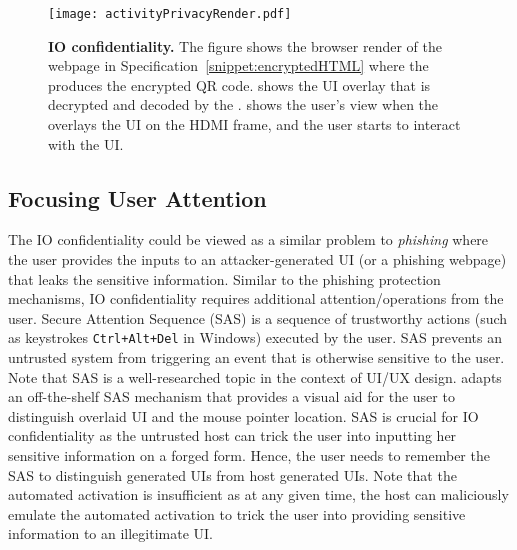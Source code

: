 \begin{figure}[t]
\centering
\texttt{[image: activityPrivacyRender.pdf]}
\caption{\textbf{\name IO confidentiality.} The figure shows \one the browser render of the webpage in Specification~\ref{snippet:encryptedHTML} where the \name \js produces the encrypted QR code. \two shows the UI overlay that is decrypted and decoded by the \device. \three shows the user's view when the \device overlays the UI on the HDMI frame, and the user starts to interact with the UI.}
\label{fig:activityPrivacy}
\centering
\end{figure}

\subsection{Focusing User Attention} 
\label{sec:confidentiality:SAS}

The IO confidentiality could be viewed as a similar problem to \emph{phishing} where the user provides the inputs to an attacker-generated UI (or a phishing webpage) that leaks the sensitive information. Similar to the phishing protection mechanisms, IO confidentiality requires additional attention/operations from the user. Secure Attention Sequence (SAS) is a sequence of trustworthy actions (such as keystrokes \texttt{Ctrl+Alt+Del} in Windows) executed by the user. SAS prevents an untrusted system from triggering an event that is otherwise sensitive to the user. Note that SAS is a well-researched topic in the context of UI/UX design. \name adapts an off-the-shelf SAS mechanism that provides a visual aid for the user to distinguish overlaid UI and the mouse pointer location. SAS is crucial for IO confidentiality as the untrusted host can trick the user into inputting her sensitive information on a forged form. Hence, the user needs to remember the SAS to distinguish \device generated UIs from host generated UIs. Note that the automated activation is insufficient as at any given time, the host can maliciously emulate the automated activation to trick the user into providing sensitive information to an illegitimate UI.

